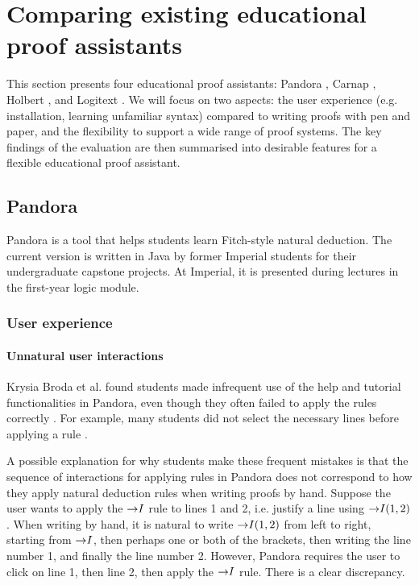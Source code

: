 
\section{Comparing existing educational proof assistants}
\label{background:comparison}
This section presents four educational proof assistants: Pandora \cite{pandora:2007, pandora}, Carnap \cite{carnap, carnap:2018}, Holbert \cite{oconnor:2022}, and Logitext \cite{yang:2022}. We will focus on two aspects: the user experience (e.g. installation, learning unfamiliar syntax) compared to writing proofs with pen and paper, and the flexibility to support a wide range of proof systems. The key findings of the evaluation are then summarised into desirable features for a flexible educational proof assistant.

\subsection{Pandora}
Pandora \cite{pandora:2007} is a tool that helps students learn Fitch-style \cite{fitch:1952} natural deduction. The current version \cite{pandora} is written in Java by former Imperial students for their undergraduate capstone projects. At Imperial, it is presented during lectures in the first-year logic module.

\subsubsection{User experience}
\paragraph{Unnatural user interactions}
Krysia Broda et al. found students made infrequent use of the help and tutorial functionalities in Pandora, even though they often failed to apply the rules correctly \cite{pandora:2007}. For example, many students did not select the necessary lines before applying a rule \cite{pandora:2007}.

A possible explanation for why students make these frequent mistakes is that the sequence of interactions for applying rules in Pandora does not correspond to how they apply natural deduction rules when writing proofs by hand. Suppose the user wants to apply the $\mathord{\to} I$ rule to lines 1 and 2, i.e. justify a line using $\mathord{\to} I(1, 2)$. When writing by hand, it is natural to write $\mathord{\to} I(1, 2)$ from left to right, starting from $\mathord{\to} I$, then perhaps one or both of the brackets, then writing the line number 1, and finally the line number 2. However, Pandora requires the user to click on line 1, then line 2, then apply the $\mathord{\to} I$ rule. There is a clear discrepancy.

